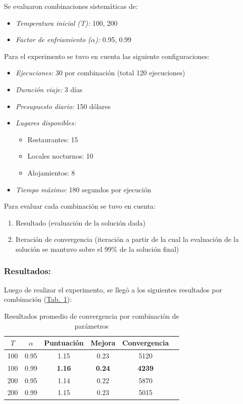 \documentclass[10pt]{llncs}
\newcommand{\tabref}[1]{\hyperref[#1]{Tab.~\ref*{#1}}}
\begin{document}
Se evaluaron combinaciones sistemáticas de:
\begin{itemize}
    \item \textit{Temperatura inicial (T):} 100, 200
    \item \textit{Factor de enfriamiento ($\alpha$):} 0.95, 0.99
\end{itemize}

Para el experimento se tuvo en cuenta las siguiente configuraciones:
\begin{itemize}
    \item \textit{Ejecuciones:} 30 por combinación (total 120 ejecuciones)
    \item \textit{Duración viaje:} 3 días
    \item \textit{Presupuesto diario:} 150 dólares
    \item \textit{Lugares disponibles:}
    \begin{itemize}
        \item Restaurantes: 15
        \item Locales nocturnos: 10
        \item Alojamientos: 8
    \end{itemize}
    \item \textit{Tiempo máximo:} 180 segundos por ejecución
\end{itemize}

Para evaluar cada combinación se tuvo en cuenta:
\begin{enumerate}
    \item Resultado (evaluación de la solución dada)
    \item Iteración de convergencia (iteración a partir de la cual la evaluación de la solución se mantuvo sobre el 99\% de la solución final)
\end{enumerate}

\subsubsection{Resultados:}

Luego de realizar el experimento, se llegó a los siguientes resultados por combinación
(\tabref{tab:resultados-finales}):

\begin{table}[h]
\centering
\caption{Resultados promedio de convergencia por combinación de parámetros}
\label{tab:resultados-finales}
\begin{tabular}{cccccc}
\toprule
$T$ & $\alpha$ & Puntuación & Mejora & Convergencia \\
\midrule
100 & 0.95 & 1.15 & 0.23 & 5120 \\
100 & 0.99 & \textbf{1.16} & \textbf{0.24} & \textbf{4239} \\
200 & 0.95 & 1.14 & 0.22 & 5870 \\
200 & 0.99 & 1.15 & 0.23 & 5015 \\
\bottomrule
\end{tabular}
\end{table}
\end{document}
